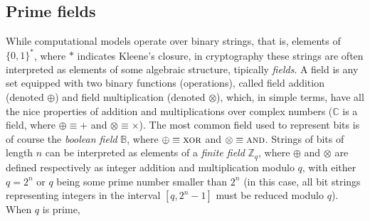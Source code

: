 \subsection{Prime fields}
While computational models operate over binary strings, that is, elements of \({\{0, 1\}}^*\),
where \(*\) indicates Kleene's closure, in cryptography these strings are often interpreted as
elements of some algebraic structure, tipically \emph{fields}.
A field is any set equipped with two binary functions (operations), called field addition
(denoted \(\oplus \)) and field multiplication (denoted \(\otimes \)), which, in simple terms, have all
the nice properties of addition and multiplications over complex numbers (\(\mathbb{C}\) is a field,
where \(\oplus \equiv +\) and \(\otimes \equiv \times \)).
The most common field used to represent bits is of course the \emph{boolean field} \(\mathbb{B}\),
where \(\oplus \equiv \textsc{xor}\) and \(\otimes \equiv \textsc{and}\).
Strings of bits of length \(n\) can be interpreted as elements of a \emph{finite field} 
\(\mathbb{Z}_{q}\), where \(\oplus \) and \(\otimes \) are defined respectively as integer addition 
and multiplication modulo \(q\), with either \(q = 2^n\) or \(q\) being some prime number 
smaller than \(2^n\) (in this case, all bit strings representing integers in the interval 
\([q, 2^n-1]\) must be reduced modulo \(q\)).
When \(q\) is prime, 

